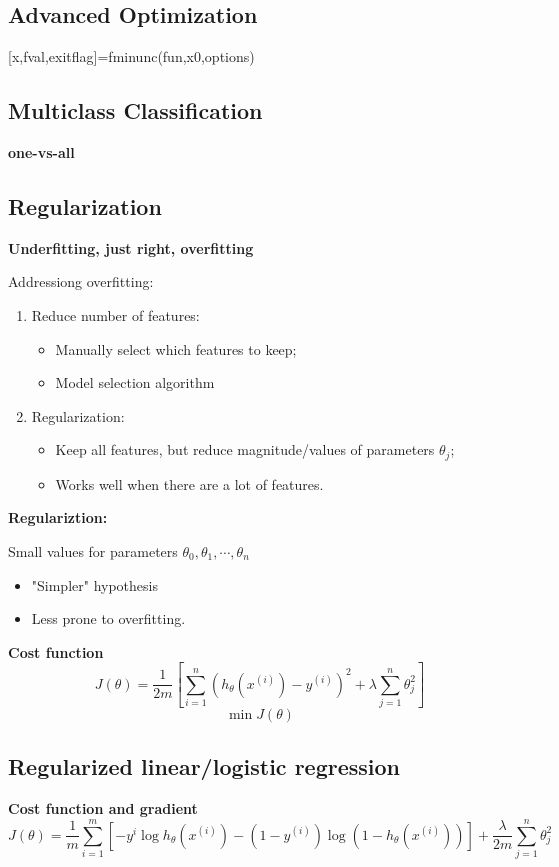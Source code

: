 \documentclass{article}
\begin{document}
\subsection{Advanced Optimization}
[x,fval,exitflag]=fminunc(fun,x0,options)

\subsection{Multiclass Classification}
\textbf{one-vs-all}

\subsection{Regularization}
\textbf{Underfitting, just right, overfitting}

Addressiong overfitting:
\begin{enumerate}
	\item Reduce number of features:
		\begin{itemize}
			\item Manually select which features to keep;
			\item Model selection algorithm
		\end{itemize}
	\item Regularization:
		\begin{itemize}
			\item Keep all features, but reduce magnitude/values of parameters $\theta_j$;
			\item Works well when there are a lot of features. 
		\end{itemize}
\end{enumerate}

\textbf{Regulariztion:}

Small values for parameters $\theta_0,\theta_1,\cdots,\theta_n$
\begin{itemize}
	\item "Simpler" hypothesis
	\item Less prone to overfitting.
\end{itemize}
\textbf{Cost function}
$$J(\theta)=\frac{1}{2m}[\sum_{i=1}^{n}(h_\theta(x^{(i)})-y^{(i)})^2 + \lambda\sum_{j=1}^{n}\theta_j^2]$$
$$\min J(\theta)$$

\subsection{Regularized linear/logistic regression}
\textbf{Cost function and gradient}
$$J(\theta)=\frac{1}{m}\sum_{i=1}^{m}[-y^i\log h_\theta(x^{(i)})-(1-y^{(i)})\log (1-h_\theta(x^{(i)}))]+\frac{\lambda}{2m}\sum_{j=1}^{n}\theta_j^2$$
\end{document}
